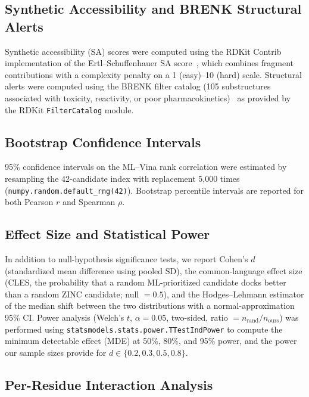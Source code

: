 \documentclass[11pt]{article}
\begin{document}
\subsection{Synthetic Accessibility and BRENK Structural Alerts}

Synthetic accessibility (SA) scores were computed using the RDKit Contrib implementation of the Ertl--Schuffenhauer SA score~\cite{ertl2009}, which combines fragment contributions with a complexity penalty on a 1 (easy)--10 (hard) scale. Structural alerts were computed using the BRENK filter catalog (105 substructures associated with toxicity, reactivity, or poor pharmacokinetics)~\cite{brenk2008} as provided by the RDKit \texttt{FilterCatalog} module.

\subsection{Bootstrap Confidence Intervals}

95\% confidence intervals on the ML--Vina rank correlation were estimated by resampling the 42-candidate index with replacement 5{,}000 times (\texttt{numpy.random.default\_rng(42)}). Bootstrap percentile intervals are reported for both Pearson $r$ and Spearman $\rho$.

\subsection{Effect Size and Statistical Power}

In addition to null-hypothesis significance tests, we report Cohen's $d$ (standardized mean difference using pooled SD), the common-language effect size (CLES, the probability that a random ML-prioritized candidate docks better than a random ZINC candidate; null $= 0.5$), and the Hodges--Lehmann estimator of the median shift between the two distributions with a normal-approximation 95\% CI. Power analysis (Welch's $t$, $\alpha = 0.05$, two-sided, ratio $= n_{\mathrm{rand}}/n_{\mathrm{ours}}$) was performed using \texttt{statsmodels.stats.power.TTestIndPower} to compute the minimum detectable effect (MDE) at 50\%, 80\%, and 95\% power, and the power our sample sizes provide for $d \in \{0.2, 0.3, 0.5, 0.8\}$.

\subsection{Per-Residue Interaction Analysis}
\end{document}
